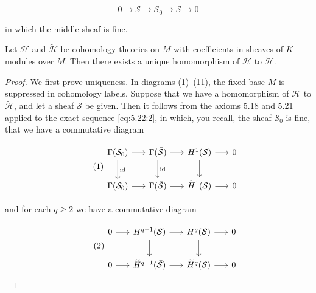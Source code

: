 \begin{equation}
\tag{2}\label{eq:5.22:2}
0\to\mathcal{S}\to\mathcal{S}_{0}\to\overline{{\mathcal{S}}}\to0
\end{equation}

in which the middle sheaf is fine.

\begin{theorem}\label{thm:5.23}
Let $\mathcal{H}$ and $\tilde{\mathcal{H}}$ be cohomology theories on $M$ with coefficients in sheaves of $K$-modules over $M$. Then there exists a unique homomorphism of $\mathcal{H}$ to $\tilde{\mathcal{H}}$.

\end{theorem}

\begin{proof}
We first prove uniqueness. In diagrams (1)--(11), the fixed base $M$ is suppressed in cohomology labels. Suppose that we have a homomorphism of $\mathcal{H}$ to $\tilde{\mathcal{H}}$, and let a sheaf $\mathcal{S}$ be given. Then it follows from the axioms 5.18 and 5.21 applied to the exact sequence \eqref{eq:5.22:2}, in which, you recall, the sheaf $\mathcal{S}_{0}$ is fine, that we have a commutative diagram

\begin{equation}
\tag{1}\label{eq:5.23:1}
\begin{tikzcd}[ampersand replacement=\&, column sep=1.6em,row sep=2em]
\Gamma(\mathcal S_0) \arrow[r] \arrow[d ,"{\mathrm{id}}"] \& \Gamma(\bar{\mathcal S}) \arrow[r] \arrow[d ,"{\mathrm{id}}"] \& H^{1}(\mathcal S) \arrow[r] \arrow[d] \& 0 \\
\Gamma(\mathcal S_0) \arrow[r] \& \Gamma(\bar{\mathcal S}) \arrow[r] \& \widetilde H^{1}(\mathcal S) \arrow[r] \& 0
\end{tikzcd}
\end{equation}

and for each $q \geq 2$ we have a commutative diagram

\begin{equation}
\tag{2}\label{eq:5.23:2}
\begin{tikzcd}[ampersand replacement=\&, column sep=1.6em,row sep=2em]
0 \arrow[r] \& H^{q-1}(\bar{\mathcal S}) \arrow[r] \arrow[d] \& H^{q}(\mathcal S) \arrow[r] \arrow[d] \& 0 \\
0 \arrow[r] \& \widetilde H^{q-1}(\bar{\mathcal S}) \arrow[r] \& \widetilde H^{q}(\mathcal S) \arrow[r] \& 0
\end{tikzcd}
\end{equation}


\end{proof}
